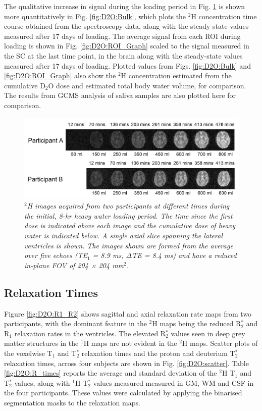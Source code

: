 The qualitative increase in signal during the loading period in Fig. \ref{fig:D2O:Load} is shown more quantitatively in Fig. \ref{fig:D2O:Bulk}, which plots the $^2$H concentration time course obtained from the spectroscopy data, along with the steady-state values measured after 17 days of loading. The average signal from each \ac{ROI} during loading is shown in Fig. \ref{fig:D2O:ROI_Graph} scaled to the signal measured in the \ac{SC} at the last time point, in the brain along with the steady-state values measured after 17 days of loading. Plotted values from Figs. \ref{fig:D2O:Bulk} and \ref{fig:D2O:ROI_Graph} also show the $^2$H concentration estimated from the cumulative D$_2$O dose and estimated total body water volume, for comparison. The results from GCMS analysis of saliva samples are also plotted here for comparison.

\begin{figure}[H]
    \centering
    \includegraphics[width=1\textwidth]{Figures/D2O/Loading.png}
    \caption{\textit{$^2$H images acquired from two participants at different times during the initial, 8-hr heavy water loading period. The time since the first dose is indicated above each image and the cumulative dose of heavy water is indicated below. A single axial slice spanning the lateral ventricles is shown. The images shown are formed from the average over five echoes (TE$_1$ = 8.9 ms, $\Delta$TE = 8.4 ms) and have a reduced in-plane \ac{FOV} of 204 × 204 mm$^2$.}}
    \label{fig:D2O:Load}
\end{figure}

\subsection{Relaxation Times}

Figure \ref{fig:D2O:R1_R2} shows sagittal and axial relaxation rate maps from two participants, with the dominant feature in the $^2$H maps being the reduced R$_2^*$ and R$_1$ relaxation rates in the ventricles. The elevated R$_2^*$ values seen in deep grey matter structures in the $^1$H maps are not evident in the $^2$H maps. Scatter plots of the voxelwise T$_1$ and T$_2^*$ relaxation times and the proton and deuterium T$_2^*$ relaxation times, across four subjects are shown in Fig. \ref{fig:D2O:scatter}. Table \ref{fig:D2O:R_times} reports the average and standard deviation of the $^2$H T$_1$ and T$_2^*$ values, along with $^1$H T$_2^*$ values measured measured in \ac{GM}, \ac{WM} and \ac{CSF} in the four participants. These values were calculated by applying the binarised segmentation masks to the relaxation maps.

